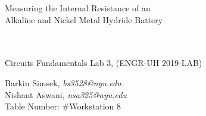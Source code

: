 \documentclass[journal]{IEEEtran}
\begin{document}
\begin{titlepage}
    {\centering
        \vspace*{20em}
        {
        \huge 
        \begin{spacing}{1.5}
            Measuring the Internal Resistance of an \\
            Alkaline and Nickel Metal Hydride Battery

            
            \\
            \\
            \bigskip
            \large
            Circuits Fundamentals Lab 3, (ENGR-UH 2019-LAB)
        \end{spacing}

        }
        
    }
    \vfill
    
    {
    \large
    
    \begin{spacing}{1.5}
    \noindent Barkin Simsek, {\it {bs3528@nyu.edu}} 
    \\
    Nishant Aswani, {\it {nsa325@nyu.edu}}
    \\
    Table Number: \#Workstation 8%
    \end{spacing}
    }


\end{titlepage}
\clearpage\mbox{}
\clearpage
{}
\setcounter{page}{1}




%
{}


\begin{abstract}
In this experiment a switch controlled LED circuit was built using a $330 \ohm$ resistor, as a visual indicator for the on/off status for a radio receiver to be implemented later. Calculations were carried out to confirm that the resistor value used was appropriate. A simulation was also run for further confirmation. Finally, the circuit was assembled by soldering components onto a prototype board and testing by applying a 9V source.
\end{abstract}
\end{document}

